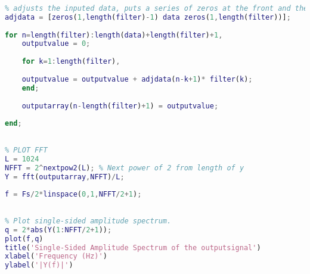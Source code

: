 \begin{lstlisting}[language=Matlab]
 
% adjusts the inputed data, puts a series of zeros at the front and the end
adjdata = [zeros(1,length(filter)-1) data zeros(1,length(filter))];
 
for n=length(filter):length(data)+length(filter)+1,
    outputvalue = 0;
   
 	for k=1:length(filter),   
 
 	outputvalue = outputvalue + adjdata(n-k+1)* filter(k);
 	end;
 	
    outputarray(n-length(filter)+1) = outputvalue;
    
end;
 
 
% PLOT FFT
L = 1024
NFFT = 2^nextpow2(L); % Next power of 2 from length of y
Y = fft(outputarray,NFFT)/L;
 
f = Fs/2*linspace(0,1,NFFT/2+1);
 
 
% Plot single-sided amplitude spectrum.
q = 2*abs(Y(1:NFFT/2+1));
plot(f,q) 
title('Single-Sided Amplitude Spectrum of the outputsignal')
xlabel('Frequency (Hz)')
ylabel('|Y(f)|')

\end{lstlisting}
